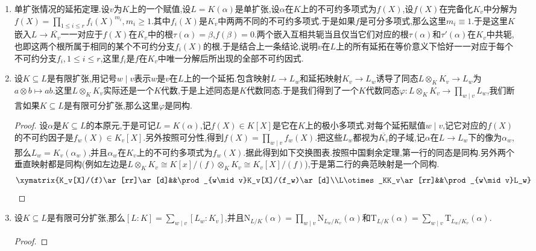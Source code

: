 \begin{enumerate}
\begin{itemize}
\begin{proof}
			必要性,设$\tau,\tau':L\to\overline{K_v}$是两个$K$嵌入,满足$\overline{v}\circ\tau=\overline{v}\circ\tau'$.记$\sigma=\tau'\circ\tau^{-1}:\tau(L)\to\tau'(L)$是一个$K$同构.于是$\sigma$可延拓为一个$K_v$同构$\sigma:\tau(L)K_v\to\tau'(L)K_v$:事实上按照$K$在$K_v$上稠密得到$\tau(L)$在$\tau(L)K_v$中稠密,于是$\tau(L)K_v$中每个元$x$可以表示为一个柯西列$\{\tau(x_n)\}$的极限,这里$\{x_n\}$是$K\subseteq L$的某个有限子扩张中的序列.按照$\overline{v}\circ\tau=\overline{v}\circ\tau'$得到序列$\{\tau'(x_n)=\sigma\tau(x_n)\}$收敛于$\tau'(L)K_v$中的一个元.于是$\sigma$延拓为$G(\overline{K_v}/K_v)$中的元,于是$\tau'=\sigma\circ\tau$,这说明$\tau$和$\tau'$是共轭的.
		\end{proof}
	\end{itemize}
	\item 单扩张情况的延拓定理.设$v$为$K$上的一个赋值,设$L=K(\alpha)$是单扩张,设$\alpha$在$K$上的不可约多项式为$f(X)$,设$f(X)$在完备化$K_v$中分解为$f(X)=\prod_{1\le i\le r}f_i(X)^{m_i},m_i\ge1$.其中$f_i(X)$是$K_v$中两两不同的不可约多项式.于是如果$f$是可分多项式,那么这里$m_i\equiv1$.于是这里$K$嵌入$L\to\overline{K_v}$一一对应于$f(X)$在$\overline{K_v}$中的根$\tau(\alpha)=\beta$,$f(\beta)=0$.两个嵌入互相共轭当且仅当它们对应的根$\tau(\alpha)$和$\tau'(\alpha)$在$K_v$中共轭,也即这两个根所属于相同的某个不可约分支$f_i(X)$的根.于是结合上一条结论,说明$v$在$L$上的所有延拓在等价意义下恰好一一对应于每个不可约分支$f_i,1\le i\le r$,这里$f_i$是$f$在$K_v$中唯一分解后所出现的全部不可约因式.
	\item 设$K\subseteq L$是有限扩张,用记号$w\mid v$表示$w$是$v$在$L$上的一个延拓.包含映射$L\to L_w$和延拓映射$K_v\to L_w$诱导了同态$L\otimes_KK_v\to L_w$为$a\otimes b\mapsto ab$.这里$L\otimes_KK_v$实际还是一个$K$代数,于是上述同态是$K$代数同态.于是我们得到了一个$K$代数同态$\varphi:L\otimes_KK_v\to\prod_{w\mid v}L_w$,我们断言如果$K\subseteq L$是有限可分扩张,那么这里$\varphi$是同构.
	\begin{proof}
		
		设$\alpha$是$K\subseteq L$的本原元,于是可记$L=K(\alpha)$,记$f(X)\in K[X]$是它在$K$上的极小多项式.对每个延拓赋值$w\mid v$,记它对应的$f(X)$的不可约因子是$f_w(X)\in K_v[X]$.另外按照可分性,得到$f(X)=\prod_{w\mid v}f_w(X)$.把这些$L_w$都视为$\overline{K_v}$的子域,记$\alpha$在$L\to L_w$下的像为$\alpha_w$,那么$L_w=K_v(\alpha_w)$,并且$\alpha_w$在$K_v$上的不可约多项式为$f_w(X)$.据此得到如下交换图表.按照中国剩余定理,第一行的同态是同构.另外两个垂直映射都是同构(例如左边是$L\otimes_KK_v\cong K[x]/(f)\otimes_KK_v\cong K_v[X]/(f)$),于是第二行的典范映射是一个同构.
		$$\xymatrix{K_v[X]/(f)\ar[rr]\ar[d]&&\prod_{w\mid v}K_v[X]/(f_w)\ar[d]\\L\otimes_KK_v\ar[rr]&&\prod_{w\mid v}L_w}$$
	\end{proof}
	\item 设$K\subseteq L$是有限可分扩张,那么$[L:K]=\sum_{w\mid v}[L_w:K_v]$,并且$\mathrm{N}_{L/K}(\alpha)=\prod_{w\mid v}\mathrm{N}_{L_w/K_v}(\alpha)$和$\mathrm{T}_{L/K}(\alpha)=\sum_{w\mid v}\mathrm{T}_{L_w/K_v}(\alpha)$.
	\begin{proof}
		

\end{proof}
\end{enumerate}
